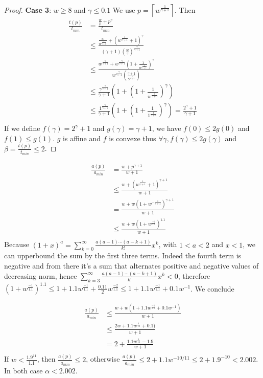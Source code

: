 \documentclass{article}
\begin{document}
\begin{proof}
\textbf{Case 3}:  $w \geq 8$ and $\gamma \leq 0.1$
We use $p=\left\lceil w^{\frac{1}{\gamma+1}} \right\rceil$.
Then
\begin{align*}
\frac{t(p)}{t_{min}}&=\frac{\frac{w}{p}+p^\gamma}{t_{min}} \\
&\leq \frac{\frac{w}{ w^{\frac{1}{\gamma+1}}}+\left(  w^{\frac{1}{\gamma+1}} +1\right)^\gamma}{ \left( \gamma+1\right)\left( \frac{w}{\gamma} \right)^{\frac{\gamma}{\gamma+1}}} \\
&\leq \frac{w^{\frac{\gamma}{\gamma+1}}+w^{\frac{\gamma}{\gamma+1}}\left(1+\frac{1}{w^{\frac{1}{\gamma+1}}}\right)^\gamma}{ w^{\frac{\gamma}{\gamma+1}}\left( \frac{\gamma+1}{\gamma^{\frac{\gamma}{\gamma+1}}} \right)} \\
&\leq \frac{\gamma^{\frac{\gamma}{\gamma+1}}}{\gamma+1}\left(1+\left(1+\frac{1}{w^{\frac{1}{\gamma+1}}}\right)^\gamma\right) \\
&\leq \frac{1^{\frac{\gamma}{\gamma+1}}}{\gamma+1}\left(1+\left(1+\frac{1}{1^{\frac{1}{\gamma+1}}}\right)^\gamma\right)=\frac{2^\gamma+1}{\gamma+1} \\
\end{align*}
If we define $f(\gamma)=2^\gamma+1$ and $g(\gamma)=\gamma+1$, we have $f(0) \leq 2g(0)$ and $f(1) \leq g(1)$. $g$ is affine and $f$ is convexe thus $\forall \gamma, f(\gamma) \leq 2g(\gamma)$ and $\beta=\frac{t(p)}{t_{min}} \leq 2$.
\end{proof}

\begin{align*}
\frac{a(p)}{a_{min}} &= \frac{w+p^{\gamma+1}}{w+1} \\
&\leq \frac{w+\left(w^{\frac{1}{\gamma+1}}+1\right)^{\gamma+1}}{w+1}\\
&= \frac{w+w\left(1+w^{-\frac{1}{\gamma+1}}\right)^{\gamma+1}}{w+1}\\
&\leq \frac{w+w\left(1+w^{\frac{-1}{1.1}}\right)^{1.1}}{w+1}\\
\end{align*}
Because $(1+x)^a=\sum_{k=0}^\infty \frac{a(a-1)\cdots(a-k+1)}{k!}x^k$, with $1<a<2$ and $x<1$, we can upperbound the sum by the first three terms. Indeed the fourth term is negative and from there it's a sum that alternates positive and negative values of decreasing norm, hence $\sum_{k=3}^\infty \frac{a(a-1)\cdots(a-k+1)}{k!}x^k<0$, therefore $\left(1+w^{\frac{-1}{1.1}}\right)^{1.1} \leq 1+1.1w^{\frac{-1}{1.1}}+\frac{0.11}{2}w^{\frac{-2}{1.1}} \leq 1+1.1w^{\frac{-1}{1.1}}+0.1w^{-1}$. We conclude

\begin{align*}
\frac{a(p)}{a_{min}} &\leq \frac{w+w(1+1.1w^{\frac{-1}{1.1}}+0.1w^{-1})}{w+1} \\
&\leq \frac{2w+1.1w^{\frac{1}{11}}+0.1)}{w+1}\\
&= 2+\frac{1.1w^{\frac{1}{11}}-1.9}{w+1} \\
\end{align*}
If $w<\frac{1.9^{11}}{1.1}$, then $\frac{a(p)}{a_{min}} \leq 2$, otherwise $\frac{a(p)}{a_{min}} \leq 2+1.1w^{-10/11} \leq 2+1.9^{-10} < 2.002$. In both case $\alpha<2.002$.
\end{document}
